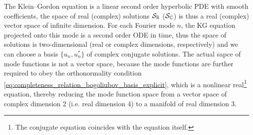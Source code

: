 \documentclass[../QFT_main.tex]{subfiles}
\begin{document}
\begin{mytheorem}
The Klein--Gordon equation is a linear second order hyperbolic PDE with smooth coefficients, the space of real (complex) solutions $\mathcal{S}_{\mathbb{R}}$ ($\mathcal{S}_{\mathbb{C}}$) is thus a real (complex) vector space of infinite dimension.
For each Fourier mode $n$, the KG equation projected onto this mode is a second order ODE in time, thus the space of solutions is two-dimensional (real or complex dimensions, respectively) and we can choose a basis $\{u_n, u_n^*\}$ of complex conjugate solutions.
The actual sapce of mode functions is not a vector space, because the mode functions are further required to obey the orthonormality condition \eqref{eq:completeness_relation_bogoliubov_basis_explicit}, which is a nonlinear real\footnote{The conjugate equation coincides with the equation itself.} equation, thereby reducing the mode function space from a vector space of complex dimension 2 (i.e. real dimension 4) to a manifold of real dimension 3. 
\end{mytheorem}
\end{document}
